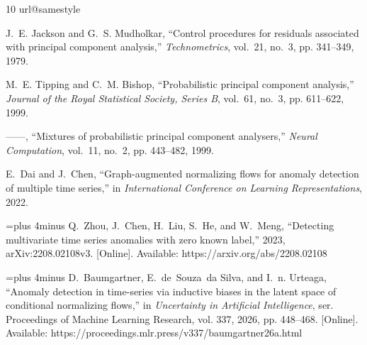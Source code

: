\documentclass[conference]{IEEEtran}
\newcommand{\1}{\mathbf{1}}
\begin{document}
\begin{thebibliography}{10}
\providecommand{\url}[1]{#1}
\csname url@samestyle\endcsname
\providecommand{\newblock}{\relax}
\providecommand{\bibinfo}[2]{#2}
\providecommand{\BIBentrySTDinterwordspacing}{\spaceskip=0pt\relax}
\providecommand{\BIBentryALTinterwordstretchfactor}{4}
\providecommand{\BIBentryALTinterwordspacing}{\spaceskip=\fontdimen2\font plus
\BIBentryALTinterwordstretchfactor\fontdimen3\font minus
  \fontdimen4\font\relax}
\providecommand{\BIBforeignlanguage}[2]{{%
\expandafter\ifx\csname l@#1\endcsname\relax
\typeout{** WARNING: IEEEtran.bst: No hyphenation pattern has been}%
\typeout{** loaded for the language `#1'. Using the pattern for}%
\typeout{** the default language instead.}%
\else
\language=\csname l@#1\endcsname
\fi
#2}}
\providecommand{\BIBdecl}{\relax}
\BIBdecl

J.~E. Jackson and G.~S. Mudholkar, ``Control procedures for residuals
  associated with principal component analysis,'' \emph{Technometrics},
  vol.~21, no.~3, pp. 341--349, 1979.

M.~E. Tipping and C.~M. Bishop, ``Probabilistic principal component analysis,''
  \emph{Journal of the Royal Statistical Society, Series B}, vol.~61, no.~3,
  pp. 611--622, 1999.

------, ``Mixtures of probabilistic principal component analysers,''
  \emph{Neural Computation}, vol.~11, no.~2, pp. 443--482, 1999.

E.~Dai and J.~Chen, ``Graph-augmented normalizing flows for anomaly detection
  of multiple time series,'' in \emph{International Conference on Learning
  Representations}, 2022.

\BIBentryALTinterwordspacing
Q.~Zhou, J.~Chen, H.~Liu, S.~He, and W.~Meng, ``Detecting multivariate time
  series anomalies with zero known label,'' 2023, arXiv:2208.02108v3. [Online].
  Available: \url{https://arxiv.org/abs/2208.02108}
\BIBentrySTDinterwordspacing

\BIBentryALTinterwordspacing
D.~Baumgartner, E.~de~Souza~da Silva, and I.~n. Urteaga, ``Anomaly detection in
  time-series via inductive biases in the latent space of conditional
  normalizing flows,'' in \emph{Uncertainty in Artificial Intelligence}, ser.
  Proceedings of Machine Learning Research, vol. 337, 2026, pp. 448--468.
  [Online]. Available:
  \url{https://proceedings.mlr.press/v337/baumgartner26a.html}
\BIBentrySTDinterwordspacing


\end{thebibliography}
\end{document}

